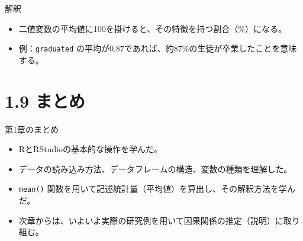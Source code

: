 \documentclass[
  ignorenonframetext,
]{beamer}
\providecommand{\tightlist}{%
  \setlength{\itemsep}{0pt}\setlength{\parskip}{0pt}}
\begin{document}
\begin{frame}[fragile]{解釈}
\protect\hypertarget{ux89e3ux91c8}{}
\begin{itemize}
\tightlist
\item
  二値変数の平均値に100を掛けると、その特徴を持つ割合（\%）になる。
\item
  例：\texttt{graduated}
  の平均が0.87であれば、約87\%の生徒が卒業したことを意味する。
\end{itemize}
\end{frame}

\hypertarget{ux307eux3068ux3081}{%
\section{1.9 まとめ}\label{ux307eux3068ux3081}}

\begin{frame}[fragile]{第1章のまとめ}
\protect\hypertarget{ux7b2c1ux7ae0ux306eux307eux3068ux3081}{}
\begin{itemize}
\tightlist
\item
  RとRStudioの基本的な操作を学んだ。
\item
  データの読み込み方法、データフレームの構造、変数の種類を理解した。
\item
  \texttt{mean()}
  関数を用いて記述統計量（平均値）を算出し、その解釈方法を学んだ。
\item
  次章からは、いよいよ実際の研究例を用いて因果関係の推定（説明）に取り組む。
\end{itemize}
\end{frame}
\end{document}
